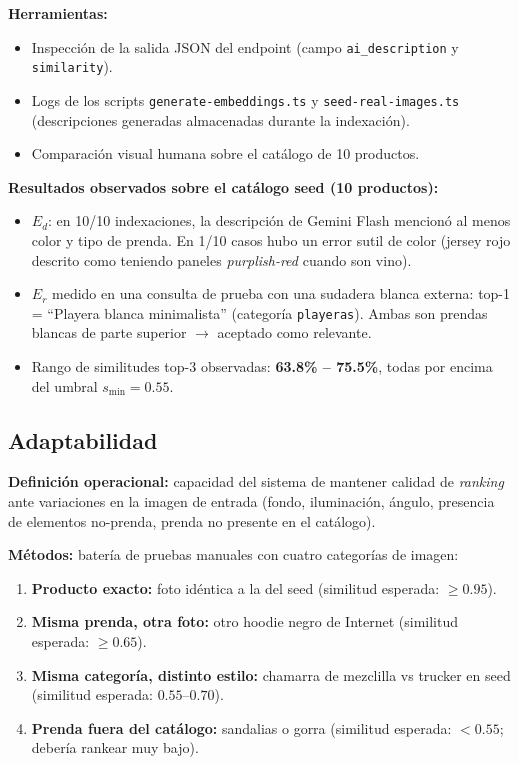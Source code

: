 \documentclass[11pt,letterpaper]{article}
\begin{document}
\textbf{Herramientas:}
\begin{itemize}[leftmargin=*]
  \item Inspección de la salida JSON del endpoint (campo \texttt{ai\_description} y \texttt{similarity}).
  \item Logs de los scripts \texttt{generate-embeddings.ts} y \texttt{seed-real-images.ts} (descripciones generadas almacenadas durante la indexación).
  \item Comparación visual humana sobre el catálogo de 10 productos.
\end{itemize}

\textbf{Resultados observados sobre el catálogo seed (10 productos):}
\begin{itemize}[leftmargin=*]
  \item $E_d$: en 10/10 indexaciones, la descripción de Gemini Flash mencionó al menos color y tipo de prenda. En 1/10 casos hubo un error sutil de color (jersey rojo descrito como teniendo paneles \textit{purplish-red} cuando son vino).
  \item $E_r$ medido en una consulta de prueba con una sudadera blanca externa: top-1 = ``Playera blanca minimalista'' (categoría \texttt{playeras}). Ambas son prendas blancas de parte superior $\rightarrow$ aceptado como relevante.
  \item Rango de similitudes top-3 observadas: \textbf{63.8\% -- 75.5\%}, todas por encima del umbral $s_{\min} = 0.55$.
\end{itemize}

\subsection{Adaptabilidad}

\textbf{Definición operacional:} capacidad del sistema de mantener calidad de \textit{ranking} ante variaciones en la imagen de entrada (fondo, iluminación, ángulo, presencia de elementos no-prenda, prenda no presente en el catálogo).

\textbf{Métodos:} batería de pruebas manuales con cuatro categorías de imagen:
\begin{enumerate}[leftmargin=*]
  \item \textbf{Producto exacto:} foto idéntica a la del seed (similitud esperada: $\geq 0.95$).
  \item \textbf{Misma prenda, otra foto:} otro hoodie negro de Internet (similitud esperada: $\geq 0.65$).
  \item \textbf{Misma categoría, distinto estilo:} chamarra de mezclilla vs trucker en seed (similitud esperada: $0.55$--$0.70$).
  \item \textbf{Prenda fuera del catálogo:} sandalias o gorra (similitud esperada: $< 0.55$; debería rankear muy bajo).
\end{enumerate}
\end{document}
